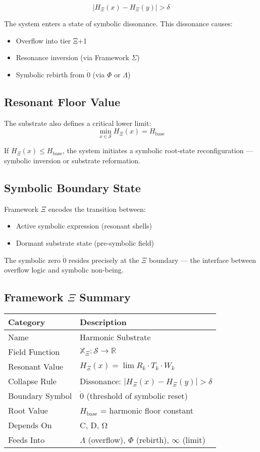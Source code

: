 \[
|H_\Xi(x) - H_\Xi(y)| > \delta
\]

The system enters a state of symbolic dissonance. This dissonance causes:
\begin{itemize}
  \item Overflow into tier Ξ+1
  \item Resonance inversion (via Framework $\Sigma$)
  \item Symbolic rebirth from $\dot{0}$ (via $\Phi$ or $\Lambda$)
\end{itemize}

\subsection*{Resonant Floor Value}

The substrate also defines a critical lower limit:
\[
\min_{x \in \mathcal{S}} H_\Xi(x) = H_\text{base}
\]

If $H_\Xi(x) \leq H_\text{base}$, the system initiates a symbolic root-state reconfiguration — symbolic inversion or substrate reformation.

\subsection*{Symbolic Boundary State}

Framework $\Xi$ encodes the transition between:
\begin{itemize}
  \item Active symbolic expression (resonant shells)
  \item Dormant substrate state (pre-symbolic field)
\end{itemize}

The symbolic zero $\dot{0}$ resides precisely at the $\Xi$ boundary — the interface between overflow logic and symbolic non-being.

\subsection*{Framework $\Xi$ Summary}

\begin{center}
\begin{tabular}{|l|l|}
\hline
\textbf{Category} & \textbf{Description} \\
\hline
Name & Harmonic Substrate \\
Field Function & $\mathbb{X}_\Xi : \mathcal{S} \rightarrow \mathbb{R}$ \\
Resonant Value & $H_\Xi(x) = \lim R_k \cdot T_k \cdot W_k$ \\
Collapse Rule & Dissonance: $|H_\Xi(x) - H_\Xi(y)| > \delta$ \\
Boundary Symbol & $\dot{0}$ (threshold of symbolic reset) \\
Root Value & $H_\text{base}$ = harmonic floor constant \\
Depends On & C, D, Ω \\
Feeds Into & $\Lambda$ (overflow), $\Phi$ (rebirth), $\infty$ (limit) \\
\hline
\end{tabular}
\end{center}

